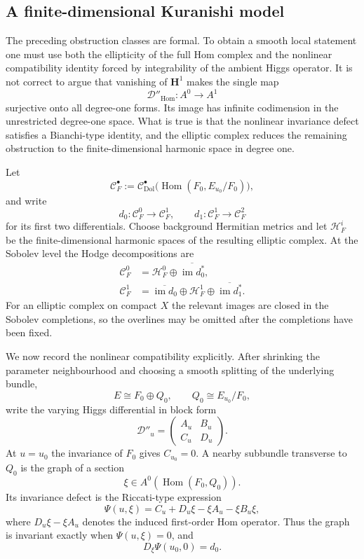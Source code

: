 \documentclass[11pt,reqno]{amsart}
\theoremstyle{definition}
\theoremstyle{remark}
\newcommand{\cC}{\mathcal C}
\newcommand{\cD}{\mathcal D}
\newcommand{\cH}{\mathcal H}
\newcommand{\Hom}{\operatorname{Hom}}
\newcommand{\im}{\operatorname{im}}
\newcommand{\Dol}{\mathrm{Dol}}
\begin{document}
\subsection{A finite-dimensional Kuranishi model}

The preceding obstruction classes are formal.  To obtain a smooth local statement one must use both the ellipticity of the full Hom complex and the nonlinear compatibility identity forced by integrability of the ambient Higgs operator.  It is not correct to argue that vanishing of $\mathbf H^1$ makes the single map
\[
  \cD''_{\Hom}:A^0\longrightarrow A^1
\]
surjective onto all degree-one forms.  Its image has infinite codimension in the unrestricted degree-one space.  What is true is that the nonlinear invariance defect satisfies a Bianchi-type identity, and the elliptic complex reduces the remaining obstruction to the finite-dimensional harmonic space in degree one.

Let
\[
  \cC^\bullet_F
  :=\cC^\bullet_{\Dol}
  \bigl(\Hom(F_0,E_{u_0}/F_0)\bigr),
\]
and write
\[
  d_0:\cC^0_F\to\cC^1_F,
  \qquad
  d_1:\cC^1_F\to\cC^2_F
\]
for its first two differentials.  Choose background Hermitian metrics and let $\cH^i_F$ be the finite-dimensional harmonic spaces of the resulting elliptic complex.  At the Sobolev level the Hodge decompositions are
\begin{align}
  \cC^0_F&=\cH^0_F\oplus\overline{\im d_0^*},\label{eq:Hodge-C0}\\
  \cC^1_F&=\overline{\im d_0}\oplus\cH^1_F
  \oplus\overline{\im d_1^*}.\label{eq:Hodge-C1}
\end{align}
For an elliptic complex on compact $X$ the relevant images are closed in the Sobolev completions, so the overlines may be omitted after the completions have been fixed.

We now record the nonlinear compatibility explicitly.  After shrinking the parameter neighbourhood and choosing a smooth splitting of the underlying bundle,
\[
  E\cong F_0\oplus Q_0,
  \qquad Q_0\cong E_{u_0}/F_0,
\]
write the varying Higgs differential in block form
\begin{equation}\label{eq:block-Du-Kuranishi}
  \cD''_u=
  \begin{pmatrix}
    A_u & B_u\\
    C_u & D_u
  \end{pmatrix}.
\end{equation}
At $u=u_0$ the invariance of $F_0$ gives $C_{u_0}=0$.  A nearby subbundle transverse to $Q_0$ is the graph of a section
\[
  \xi\in A^0(\Hom(F_0,Q_0)).
\]
Its invariance defect is the Riccati-type expression
\begin{equation}\label{eq:Psi-graph}
  \Psi(u,\xi)
  =C_u+D_u\xi-\xi A_u-\xi B_u\xi,
\end{equation}
where $D_u\xi-\xi A_u$ denotes the induced first-order Hom operator.  Thus the graph is invariant exactly when $\Psi(u,\xi)=0$, and
\[
  D_\xi\Psi(u_0,0)=d_0.
\]
\end{document}
